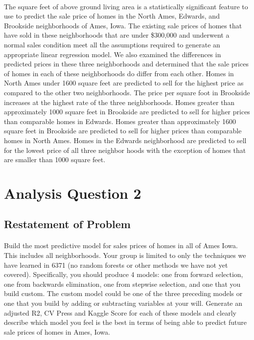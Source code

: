\documentclass[11pt]{scrartcl} %
\begin{document}
\paragraph{} The square feet of above ground living area is a statistically significant feature to use to predict the sale price of homes in the North Ames, Edwards, and Brookside neighborhoods of Ames, Iowa. The existing sale prices of homes that have sold in these neighborhoods that are under \$300,000 and underwent a normal sales condition meet all the assumptions required to generate an appropriate linear regression model. We also examined the differences in predicted prices in these three neighborhoods and determined that the sale prices of homes in each of these neighborhoods do differ from each other. Homes in North Ames under 1600 square feet are predicted to sell for the highest price as compared to the other two neighborhoods. The price per square foot in Brookside increases at the highest rate of the three neighborhoods. Homes greater than approximately 1000 square feet in Brookside are predicted to sell for higher prices than comparable homes in Edwards. Homes greater than approximately 1600 square feet in Brookside are predicted to sell for higher prices than comparable homes in North Ames. Homes in the Edwards neighborhood are predicted to sell for the lowest price of all three neighbor hoods with the exception of homes that are smaller than 1000 square feet.

\section{Analysis Question 2}

\subsection{Restatement of Problem}
\paragraph{} Build the most predictive model for sales prices of homes in all of Ames Iowa.  This includes all neighborhoods. Your group is limited to only the techniques we have learned in 6371 (no random forests or other methods we have not yet covered).  Specifically, you should produce 4 models: one from forward selection, one from backwards elimination, one from stepwise selection, and one that you build custom.  The custom model could be one of the three preceding models or one that you build by adding or subtracting variables at your will.  Generate an adjusted R2, CV Press and Kaggle Score for each of these models and clearly describe which model you feel is the best in terms of being able to predict future sale prices of homes in Ames, Iowa. 
\end{document}
